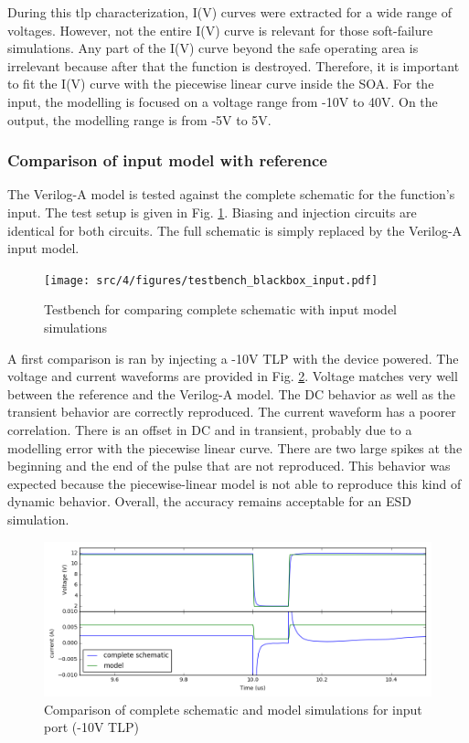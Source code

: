 During this \gls{tlp} characterization, I(V) curves were extracted for a wide range of voltages.
However, not the entire I(V) curve is relevant for those soft-failure simulations.
Any part of the I(V) curve beyond the safe operating area is irrelevant because after that the function is destroyed.
Therefore, it is important to fit the I(V) curve with the piecewise linear curve inside the SOA.
For the input, the modelling is focused on a voltage range from -10V to 40V.
On the output, the modelling range is from -5V to 5V.

\subsubsection{Comparison of input model with reference}

The Verilog-A model is tested against the complete schematic for the function's input.
The test setup is given in Fig. \ref{fig:compare-veriloga-model-input}.
Biasing and injection circuits are identical for both circuits.
The full schematic is simply replaced by the Verilog-A input model.

\begin{figure}[!h]
  \centering
  \texttt{[image: src/4/figures/testbench\_blackbox\_input.pdf]}
  \caption{Testbench for comparing complete schematic with input model simulations}
  \label{fig:compare-veriloga-model-input}
\end{figure}

A first comparison is ran by injecting a -10V TLP with the device powered.
The voltage and current waveforms are provided in Fig. \ref{fig:compare-model-simu-m10}.
Voltage matches very well between the reference and the Verilog-A model.
The DC behavior as well as the transient behavior are correctly reproduced.
The current waveform has a poorer correlation.
There is an offset in DC and in transient, probably due to a modelling error with the piecewise linear curve.
There are two large spikes at the beginning and the end of the pulse that are not reproduced.
This behavior was expected because the piecewise-linear model is not able to reproduce this kind of dynamic behavior.
Overall, the accuracy remains acceptable for an ESD simulation.

\begin{figure}[!h]
  \centering
  \includegraphics[width=\textwidth]{src/4/figures/comparison_model_total_m10V.png}
  \caption{Comparison of complete schematic and model simulations for input port (-10V TLP)}
  \label{fig:compare-model-simu-m10}
\end{figure}

